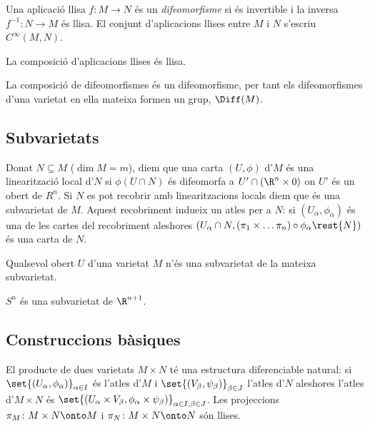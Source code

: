 \documentclass[12pt,twocolumn]{article}
\begin{document}
\begin{definition}[Difeomorfisme]
	Una aplicació llisa \( f \colon M \to N \) és un \emph{difeomorfisme} si és invertible
	i la inversa	\( f^{-1} \colon N \to M \) és llisa. El conjunt d'aplicacions llises
	entre \( M \) i \( N \) s'escriu \( C^\infty(M,N) \).
\end{definition}

\begin{observation}
	\begin{points}
	\item La composició d'aplicacions llises és llisa.
	\item La composició de difeomorfismes és un difeomorfisme, per tant els difeomorfismes
		d'una varietat en ella mateixa formen un grup, \( \Diff(M) \).
	\end{points}
\end{observation}

\subsection{Subvarietats}
\begin{definition}[Subvarietat]
	Donat \( N \subseteq M \) (\( \dim M = m \)), diem que una carta \( (U,\phi) \) d'\( M
	\) és una linearització local d'\( N \) si \( \phi(U \cap N)  \) és difeomorfa a \( U'
	\cap (\R^n \times 0) \) on \( U' \) és un obert de \( R^n \).  Si \( N \) es pot
	recobrir amb linearitzacions locals diem que és una subvarietat de \( M \). Aquest
	recobriment indueix un atles per a \( N \): si \( (U_\alpha, \phi_\alpha) \) és una de
	les cartes del recobriment aleshores \( (U_\alpha \cap N, (\pi_1 \times \dots \pi_n)
	\circ \phi_\alpha \rest{N}) \) és una carta de \( N \). 
\end{definition}

\begin{example}
	\begin{points}
	\item	Qualsevol obert \( U \) d'una varietat \( M \) n'és una subvarietat de la mateixa
		subvarietat. 
	\item \( S^n \) és una subvarietat de \( \R^{n+1} \). 
	\end{points}
\end{example}

\subsection{Construccions bàsiques}
\begin{definition}[Producte]
	El producte de dues varietats \( M \times N \) té una estructura diferenciable natural:
	si \( \set{(U_\alpha, \phi_\alpha)}_{\alpha \in I} \) és l'atles d'\( M \) i \(
	\set{(V_\beta, \psi_\beta)}_{\beta \in J} \) l'atles d'\( N \) aleshores l'atles d'\( M
	\times N \) és \( \set{(U_\alpha \times V_\beta, \phi_\alpha \times \psi_\beta)}_{\alpha
	\in I, \beta \in J} \). Les projeccions \( \pi_M \colon M \times N \onto M \) i \( \pi_N
	\colon M \times N \onto N \) són llises. 
\end{definition}
\end{document}
